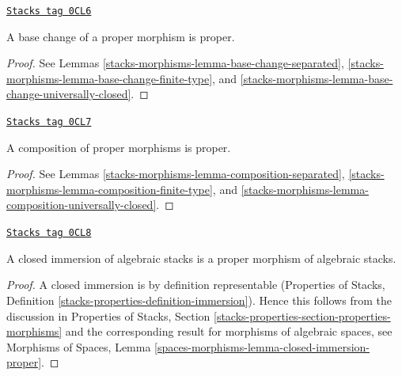 \begin{lemma}
\label{stacks-morphisms-lemma-base-change-proper}
\href{https://stacks.math.columbia.edu/tag/0CL6}{\texttt{Stacks tag 0CL6}}

A base change of a proper morphism is proper.
\end{lemma}

\begin{proof}
See
Lemmas \ref{stacks-morphisms-lemma-base-change-separated},
\ref{stacks-morphisms-lemma-base-change-finite-type}, and
\ref{stacks-morphisms-lemma-base-change-universally-closed}.
\end{proof}

\begin{lemma}
\label{stacks-morphisms-lemma-composition-proper}
\href{https://stacks.math.columbia.edu/tag/0CL7}{\texttt{Stacks tag 0CL7}}

A composition of proper morphisms is proper.
\end{lemma}

\begin{proof}
See
Lemmas \ref{stacks-morphisms-lemma-composition-separated},
\ref{stacks-morphisms-lemma-composition-finite-type}, and
\ref{stacks-morphisms-lemma-composition-universally-closed}.
\end{proof}

\begin{lemma}
\label{stacks-morphisms-lemma-closed-immersion-proper}
\href{https://stacks.math.columbia.edu/tag/0CL8}{\texttt{Stacks tag 0CL8}}

A closed immersion of algebraic stacks is a proper morphism of
algebraic stacks.
\end{lemma}

\begin{proof}
A closed immersion is by definition representable
(Properties of Stacks, Definition
\ref{stacks-properties-definition-immersion}).
Hence this follows from the discussion in
Properties of Stacks, Section
\ref{stacks-properties-section-properties-morphisms}
and the corresponding result for morphisms of algebraic spaces, see
Morphisms of Spaces, Lemma
\ref{spaces-morphisms-lemma-closed-immersion-proper}.
\end{proof}

